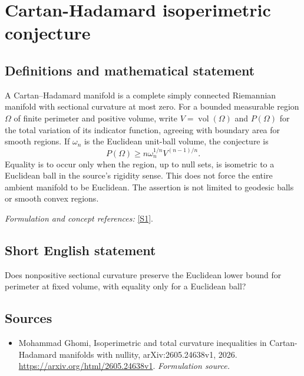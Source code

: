 \documentclass[11pt]{article}
\begin{document}
\section*{\texorpdfstring{Cartan-Hadamard isoperimetric conjecture}{Cartan-Hadamard isoperimetric conjecture}}\label{statement}
\subsection{Definitions and mathematical statement}
A Cartan--Hadamard manifold is a complete simply connected Riemannian manifold with sectional curvature at most zero. For a bounded measurable region $\Omega$ of finite perimeter and positive volume, write $V=\operatorname{vol}(\Omega)$ and $P(\Omega)$ for the total variation of its indicator function, agreeing with boundary area for smooth regions. If $\omega_n$ is the Euclidean unit-ball volume, the conjecture is
\[
 P(\Omega)\ge n\omega_n^{1/n}V^{(n-1)/n}.
\]
Equality is to occur only when the region, up to null sets, is isometric to a Euclidean ball in the source's rigidity sense. This does not force the entire ambient manifold to be Euclidean. The assertion is not limited to geodesic balls or smooth convex regions.
\par\smallskip\textit{Formulation and concept references:} \href{https://arxiv.org/html/2605.24638v1}{[S1]}.

\subsection{Short English statement}
Does nonpositive sectional curvature preserve the Euclidean lower bound for perimeter at fixed volume, with equality only for a Euclidean ball?
\subsection{Sources}
\begin{itemize}
\item[S1]Mohammad Ghomi, Isoperimetric and total curvature inequalities in Cartan-Hadamard manifolds with nullity, arXiv:2605.24638v1, 2026.
\url{https://arxiv.org/html/2605.24638v1}.
\textit{Formulation source.}
\end{itemize}
\end{document}
